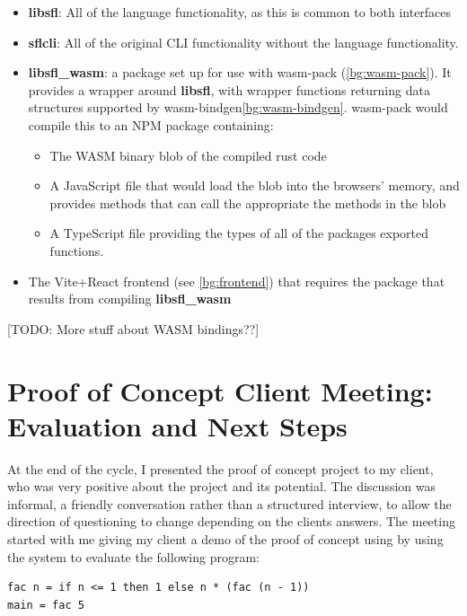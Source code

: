\begin{itemize}
    \item \textbf{libsfl}: All of the language functionality, as this is common to both interfaces
    \item \textbf{sflcli}: All of the original CLI functionality without the language functionality.  
    \item \textbf{libsfl\_wasm}: a package set up for use with wasm-pack (\ref{bg:wasm-pack}). It provides a wrapper around \textbf{libsfl}, with wrapper functions returning data structures supported by wasm-bindgen\ref{bg:wasm-bindgen}. wasm-pack would compile this to an \ac{NPM} package containing:
    \begin{itemize}
        \item The WASM binary blob of the compiled rust code
        \item A JavaScript file that would load the blob into the browsers' memory, and provides methods that can call the appropriate the methods in the blob
        \item A TypeScript file providing the types of all of the packages exported functions. 
    \end{itemize}
    \item The Vite+React frontend (see \ref{bg:frontend}) that requires the package that results from compiling \textbf{libsfl\_wasm}
\end{itemize}



[TODO: More stuff about WASM bindings??]

\section{Proof of Concept Client Meeting: Evaluation and \newline Next Steps}
\label{eval:c1}
At the end of the cycle, I presented the proof of concept project to my client, who was very positive about the project and its potential. The discussion was informal, a friendly conversation rather than a structured interview, to allow the direction of questioning to change depending on the clients answers. The meeting started with me giving my client a demo of the proof of concept using by using the system to evaluate the following program:
\begin{verbatim}
fac n = if n <= 1 then 1 else n * (fac (n - 1))
main = fac 5
\end{verbatim}

